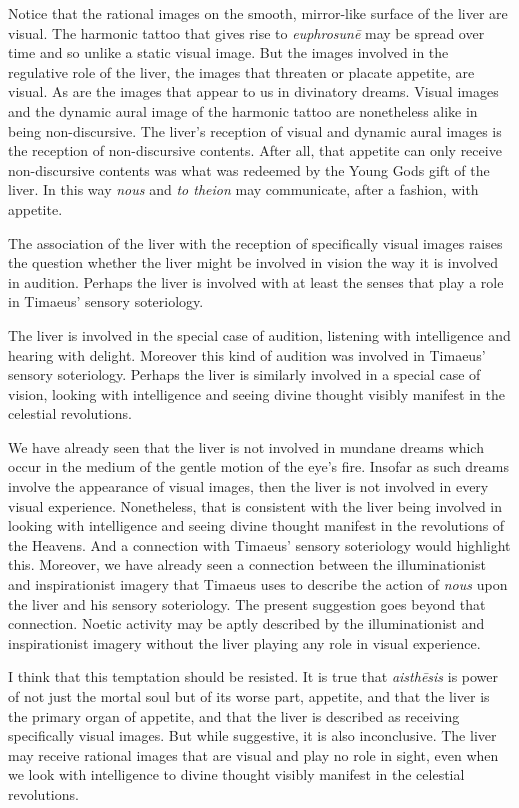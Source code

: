 Notice that the rational images on the smooth, mirror-like surface of the liver are visual. The harmonic tattoo that gives rise to \emph{euphrosunē} may be spread over time and so unlike a static visual image. But the images involved in the regulative role of the liver, the images that threaten or placate appetite, are visual. As are the images that appear to us in divinatory dreams. Visual images and the dynamic aural image of the harmonic tattoo are nonetheless alike in being non-discursive. The liver's reception of visual and dynamic aural images is the reception of non-discursive contents. After all, that appetite can only receive non-discursive contents was what was redeemed by the Young Gods gift of the liver. In this way \emph{nous} and \emph{to theion} may communicate, after a fashion, with appetite.

The association of the liver with the reception of specifically visual images raises the question whether the liver might be involved in vision the way it is involved in audition. Perhaps the liver is involved with at least the senses that play a role in Timaeus' sensory soteriology. 

The liver is involved in the special case of audition, listening with intelligence and hearing with delight. Moreover this kind of audition was involved in Timaeus' sensory soteriology. Perhaps the liver is similarly involved in a special case of vision, looking with intelligence and seeing divine thought visibly manifest in the celestial revolutions.   


We have already seen that the liver is not involved in mundane dreams which occur in the medium of the gentle motion of the eye's fire. Insofar as such dreams involve the appearance of visual images, then the liver is not involved in every visual experience. Nonetheless, that is consistent with the liver being involved in looking with intelligence and seeing divine thought manifest in the revolutions of the Heavens. And a connection with Timaeus' sensory soteriology would highlight this. Moreover, we have already seen a connection between the illuminationist and inspirationist imagery that Timaeus uses to describe the action of \emph{nous} upon the liver and his sensory soteriology. The present suggestion goes beyond that connection. Noetic activity may be aptly described by the illuminationist and inspirationist imagery without the liver playing any role in visual experience.

I think that this temptation should be resisted. It is true that \emph{aisthēsis} is power of not just the mortal soul but of its worse part, appetite, and that the liver is the primary organ of appetite, and that the liver is described as receiving specifically visual images. But while suggestive, it is also inconclusive. The liver may receive rational images that are visual and play no role in sight, even when we look with intelligence to divine thought visibly manifest in the celestial revolutions.


